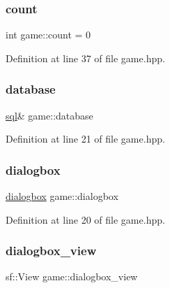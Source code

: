 \subsubsection{\texorpdfstring{count}{count}}
{\footnotesize\ttfamily int game\+::count = 0\hspace{0.3cm}{\ttfamily [private]}}



Definition at line 37 of file game.\+hpp.

\mbox{\label{classgame_aa6c2206b4735cd2c90f934384c350e0a}} 
\subsubsection{\texorpdfstring{database}{database}}
{\footnotesize\ttfamily \hyperlink{classsql}{sql}\& game\+::database\hspace{0.3cm}{\ttfamily [private]}}



Definition at line 21 of file game.\+hpp.

\mbox{\label{classgame_a2ea8501912521b1b00dcd29284039234}} 
\subsubsection{\texorpdfstring{dialogbox}{dialogbox}}
{\footnotesize\ttfamily \hyperlink{classdialogbox}{dialogbox} game\+::dialogbox\hspace{0.3cm}{\ttfamily [private]}}



Definition at line 20 of file game.\+hpp.

\mbox{\label{classgame_aead46333e3eb81e970a9d10d0b2481c9}} 
\subsubsection{\texorpdfstring{dialogbox\+\_\+view}{dialogbox\_view}}
{\footnotesize\ttfamily sf\+::\+View game\+::dialogbox\+\_\+view\hspace{0.3cm}{\ttfamily [private]}}



